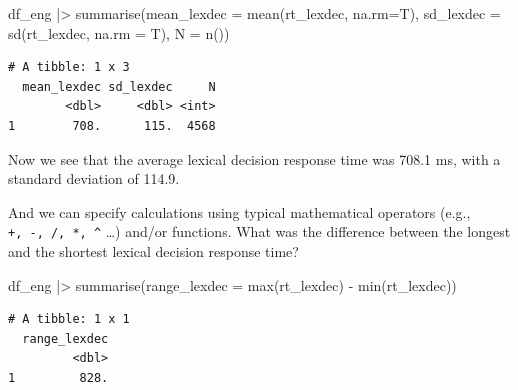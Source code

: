 \documentclass[
  letterpaper,
  DIV=11,
  numbers=noendperiod]{scrartcl}
\newenvironment{Shaded}{\begin{snugshade}}{\end{snugshade}}
\newcommand{\AttributeTok}[1]{\textcolor[rgb]{0.40,0.45,0.13}{#1}}
\newcommand{\FunctionTok}[1]{\textcolor[rgb]{0.28,0.35,0.67}{#1}}
\newcommand{\NormalTok}[1]{\textcolor[rgb]{0.00,0.23,0.31}{#1}}
\newcommand{\SpecialCharTok}[1]{\textcolor[rgb]{0.37,0.37,0.37}{#1}}
\begin{document}
\begin{Shaded}
\begin{Highlighting}[]
\NormalTok{df\_eng }\SpecialCharTok{|\textgreater{}}
  \FunctionTok{summarise}\NormalTok{(}\AttributeTok{mean\_lexdec =} \FunctionTok{mean}\NormalTok{(rt\_lexdec, }\AttributeTok{na.rm=}\NormalTok{T),}
            \AttributeTok{sd\_lexdec =} \FunctionTok{sd}\NormalTok{(rt\_lexdec, }\AttributeTok{na.rm =}\NormalTok{ T),}
            \AttributeTok{N =} \FunctionTok{n}\NormalTok{()) }
\end{Highlighting}
\end{Shaded}

\begin{verbatim}
# A tibble: 1 x 3
  mean_lexdec sd_lexdec     N
        <dbl>     <dbl> <int>
1        708.      115.  4568
\end{verbatim}

Now we see that the average lexical decision response time was 708.1 ms,
with a standard deviation of 114.9.

And we can specify calculations using typical mathematical operators
(e.g., \texttt{+,\ -,\ /,\ *,\ \^{}} \ldots) and/or functions. What was
the difference between the longest and the shortest lexical decision
response time?

\begin{Shaded}
\begin{Highlighting}[]
\NormalTok{df\_eng }\SpecialCharTok{|\textgreater{}}
  \FunctionTok{summarise}\NormalTok{(}\AttributeTok{range\_lexdec =} \FunctionTok{max}\NormalTok{(rt\_lexdec) }\SpecialCharTok{{-}} \FunctionTok{min}\NormalTok{(rt\_lexdec))}
\end{Highlighting}
\end{Shaded}

\begin{verbatim}
# A tibble: 1 x 1
  range_lexdec
         <dbl>
1         828.
\end{verbatim}
\end{document}
